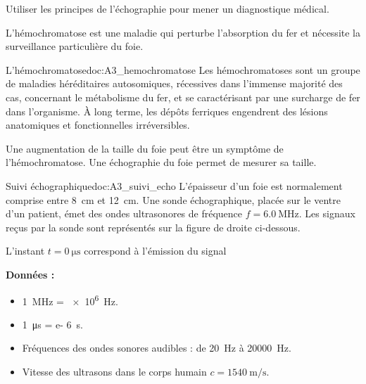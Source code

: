 \teteTermStssImag



\begin{objectifs}
  \item Utiliser les principes de l'échographie pour mener un diagnostique médical.
\end{objectifs}

\begin{contexte}
  L’hémochromatose est une maladie qui perturbe l’absorption du fer et nécessite la surveillance particulière du foie.

\end{contexte}


\begin{doc}{L'hémochromatose}{doc:A3_hemochromatose}
  Les hémochromatoses sont un groupe de maladies héréditaires autosomiques, 
  récessives dans l'immense majorité des cas,
  concernant le métabolisme du fer,
  et se caractérisant par une surcharge de fer dans l'organisme.
  À long terme, les dépôts ferriques engendrent des lésions anatomiques et fonctionnelles irréversibles.
  
  Une augmentation de la taille du foie peut être un symptôme de l'hémochromatose.
  Une échographie du foie permet de mesurer sa taille.
\end{doc}


\begin{doc}{Suivi échographique}{doc:A3_suivi_echo}
  L’épaisseur d’un foie est normalement comprise entre \qty{8}{\cm} et \qty{12}{\cm}.
  Une sonde échographique, placée sur le ventre d’un patient,
  émet des ondes  ultrasonores de fréquence $f = \qty{6,0}{\mega\hertz}$.
  Les signaux reçus par la sonde sont représentés sur la figure de droite ci-dessous.

  
  L’instant $t = \qty{0}{\micro\s}$ correspond à l’émission du signal

  \textbf{Données :}
  \begin{itemize}
    \item \qty{1}{\mega\hertz} = \qty{e6}{\hertz}.
    \item \qty{1}{\micro\s} = \qty{e- 6}{\s}.
    \item Fréquences des ondes sonores audibles : de \qty{20}{\hertz} à \qty{20000}{\hertz}.
    \item Vitesse des ultrasons dans le corps humain $c = \qty{1540}{\m\per\s}$.
  \end{itemize}
\end{doc}


